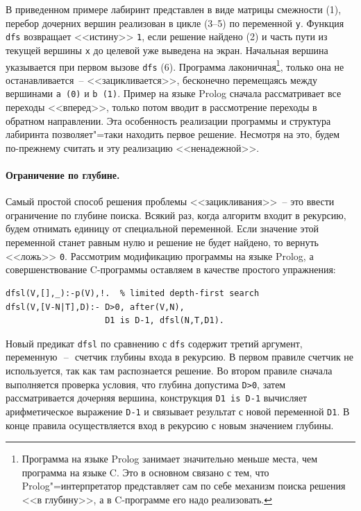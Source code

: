 \documentclass[a4paper,14pt, openany, twoside, final]{extbook} %
\begin{document}
В приведенном примере лабиринт представлен в виде матрицы смежности (1), перебор дочерних вершин реализован в цикле (3--5) по переменной \texttt{y}.  Функция \texttt{dfs} возвращает <<истину>> \texttt{1}, если решение найдено (2) и часть пути из текущей вершины \texttt{x} до целевой уже выведена на экран.  Начальная вершина указывается при первом вызове \texttt{dfs} (6).  Программа лаконичная\footnote{Программа на языке Prolog занимает значительно меньше места, чем программа на языке C.  Это в основном связано с тем, что Prolog"=интерпретатор представляет сам по себе механизм поиска решения <<в глубину>>, а в C-программе его надо реализовать.}, только она не останавливается~-- <<зацикливается>>, бесконечно перемещаясь между вершинами \texttt{a~(0)} и \texttt{b~(1)}.  Пример на языке \foreignlanguage{english}{Prolog} сначала рассматривает все переходы <<вперед>>, только потом вводит в рассмотрение переходы в обратном направлении.  Эта особенность реализации программы и структура лабиринта позволяет"=таки находить первое решение.  Несмотря на это, будем по-прежнему считать и эту реализацию <<ненадежной>>.

\paragraph{Ограничение по глубине.} Самый простой способ решения проблемы <<зацикливания>>~-- это ввести ограничение по глубине поиска.  Всякий раз, когда алгоритм входит в рекурсию, будем отнимать единицу от специальной переменной.  Если значение этой переменной станет равным нулю и решение не будет найдено, то вернуть <<ложь>> \texttt{0}.  Рассмотрим модификацию программы на языке Prolog, а совершенствование C-программы оставляем в качестве простого упражнения:

\begin{verbatim}
dfsl(V,[],_):-p(V),!.  % limited depth-first search
dfsl(V,[V-N|T],D):- D>0, after(V,N),
                    D1 is D-1, dfsl(N,T,D1).
\end{verbatim}


Новый предикат \texttt{dfsl} по сравнению с \texttt{dfs} содержит третий аргумент, переменную\,~--~\,счетчик глубины входа в рекурсию.  В первом правиле счетчик не используется, так как там распознается решение.  Во втором правиле сначала выполняется проверка условия, что глубина допустима \texttt{D>0}, затем рассматривается дочерняя вершина, конструкция \texttt{D1 is D-1} вычисляет арифметическое выражение \texttt{D-1} и связывает результат с новой переменной \texttt{D1}.  В конце правила осуществляется вход в рекурсию с новым значением глубины.
\end{document}
